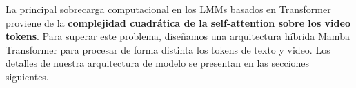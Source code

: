 La principal sobrecarga computacional en los LMMs basados en Transformer proviene de la \textbf{complejidad cuadrática de la self-attention sobre los video tokens}. Para superar este problema, diseñamos una arquitectura híbrida Mamba Transformer para procesar de forma distinta los tokens de texto y video. Los detalles de nuestra arquitectura de modelo se presentan en las secciones siguientes.
